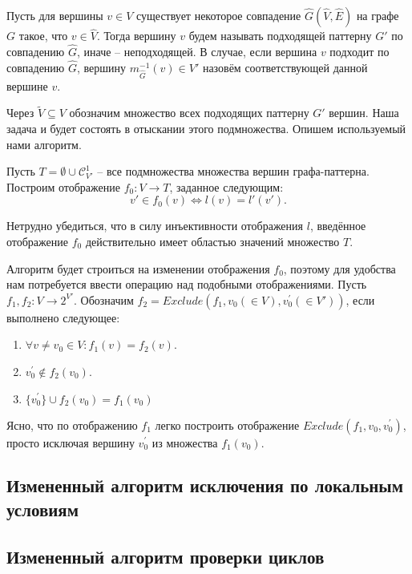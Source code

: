 Пусть для вершины $v \in V$ существует некоторое совпадение  $\widehat{G}(\widehat{V}, \widehat{E})$ на графе $G$ такое, что $v \in \widehat{V}$. Тогда вершину $v$ будем называть подходящей паттерну $G'$ по совпадению $\widehat{G}$, иначе -- неподходящей. В случае, если вершина $v$ подходит по совпадению $\widehat{G}$, вершину $m_{\widehat{G}}^{-1}(v) \in  V'$ назовём соответствующей данной вершине $v$.

Через $\widetilde{V} \subseteq V$ обозначим множество всех подходящих паттерну $G'$ вершин. Наша задача и будет состоять в отыскании этого подмножества. Опишем используемый нами алгоритм.

Пусть $T = \emptyset \cup \mathcal{C}_{V'}^1$ -- все подмножества множества вершин графа-паттерна. Построим отображение $f_0 : V \to T$, заданное следующим:
\begin{equation}
v' \in f_0(v) \Leftrightarrow l(v) = l'(v').
\end{equation}

Нетрудно убедиться, что в силу инъективности отображения $l$, введённое отображение $f_0$ действительно имеет областью значений множество $T$.

Алгоритм будет строиться на изменении отображения $f_0$, поэтому для удобства нам потребуется ввести операцию над подобными отображениями. Пусть $f_1, f_2 : V \to 2^{V'}$. Обозначим $f_2 = Exclude(f_1, v_0 (\in V), v^{\prime}_0 (\in V'))$, если выполнено следующее:
\begin{enumerate}
	\item $\forall v \ne v_0 \in V: f_1(v) = f_2(v)$.
	\item $v^{\prime}_0 \notin f_2(v_0)$.
	\item $\{v^{\prime}_0\} \cup f_2(v_0) = f_1(v_0)$
\end{enumerate}

Ясно, что по отображению $f_1$ легко построить отображение $Exclude(f_1, v_0, v^{\prime}_0)$, просто исключая вершину $v^{\prime}_0$ из множества $f_1(v_0)$.
\subsection{Измененный алгоритм исключения по локальным условиям}

\subsection{Измененный алгоритм проверки циклов}